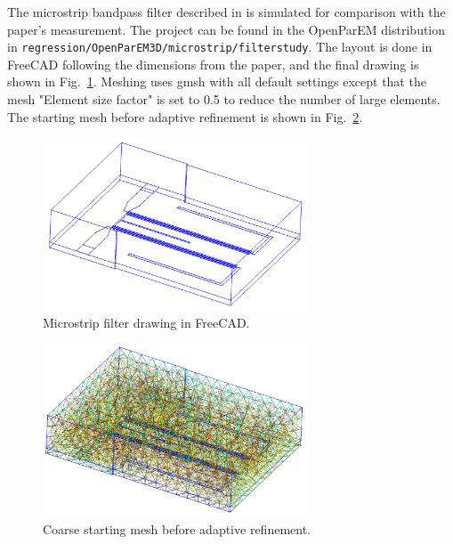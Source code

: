 \documentclass[titlepage]{article}
\renewcommand\_{\textunderscore\linebreak[1]}
\begin{document}
The microstrip bandpass filter described in \cite{Weng} is simulated for comparison with the paper's measurement.  The project can be found in the OpenParEM distribution in \texttt{regression/OpenParEM3D/microstrip/filter\_study}.  The layout is done in FreeCAD \cite{FreeCAD} following the dimensions from the paper, and the final drawing is shown in Fig.~\ref{fig:filter_drawing}.  Meshing uses gmsh \cite{gmsh}\cite{gmshweb} with all default settings except that the mesh "Element size factor" is set to 0.5 to reduce the number of large elements.  The starting mesh before adaptive refinement is shown in Fig.~\ref{fig:filter_starting_mesh}.
\begin{figure}[H]
  \centering
  \includegraphics[width=0.7\textwidth]{../regression/OpenParEM3D/microstrip/filter_study/screenshots/filter_drawing}
  \caption{Microstrip filter drawing in FreeCAD.}
  \label{fig:filter_drawing}
\end{figure}
\begin{figure}[H]
  \centering
  \includegraphics[width=0.7\textwidth]{../regression/OpenParEM3D/microstrip/filter_study/screenshots/filter_starting_mesh}
  \caption{Coarse starting mesh before adaptive refinement.}
  \label{fig:filter_starting_mesh}
\end{figure}
\end{document}
